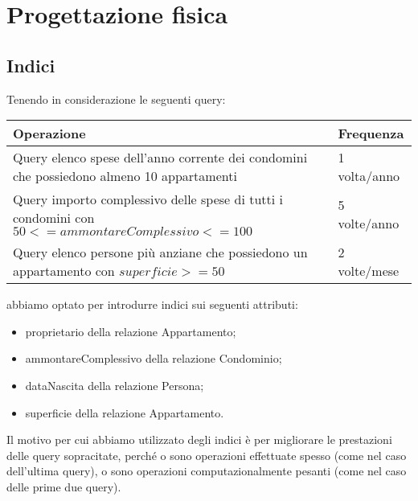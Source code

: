 \section{Progettazione fisica}
\label{fisico}

\subsection{Indici}

Tenendo in considerazione le seguenti query:

\begin{tabular}{|p{320pt}|l|}
	\hline
	\textbf{Operazione} & \textbf{Frequenza} \\ \hline
	Query elenco spese dell'anno corrente dei condomini che possiedono almeno 10 appartamenti & 1 volta/anno \\ \hline
	Query importo complessivo delle spese di tutti i condomini con $50 <= ammontareComplessivo <= 100$ & 5 volte/anno \\ \hline
	Query elenco persone più anziane che possiedono un appartamento con $superficie >= 50$ & 2 volte/mese \\ \hline
\end{tabular}

abbiamo optato per introdurre indici sui seguenti attributi:

\begin{itemize}
    \item proprietario della relazione Appartamento;
    \item ammontareComplessivo della relazione Condominio;
    \item dataNascita della relazione Persona;
    \item superficie della relazione Appartamento.
\end{itemize}

Il motivo per cui abbiamo utilizzato degli indici è per migliorare le prestazioni delle query sopracitate, perché o sono operazioni effettuate spesso (come nel caso dell'ultima query), o sono operazioni computazionalmente pesanti (come nel caso delle prime due query).
